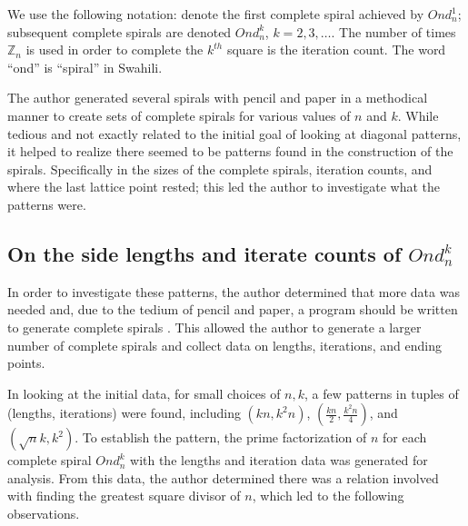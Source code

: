 \documentclass[11pt,reqno]{amsart}
\theoremstyle{mydef}
\def\ZZ{\mathbb{Z}}
\begin{document}
We use the following notation: denote the first complete spiral
achieved by $Ond^1_n$; subsequent complete spirals are denoted
$Ond^k_n$, $k = 2,3,\dots$.  The number of times $\ZZ_n$ is used in
order to complete the $k^{th}$ square is the iteration count.  The
word ``ond'' is ``spiral'' in Swahili.


The author generated several spirals with pencil and paper in a
methodical manner to create sets of complete spirals for various
values of $n$ and $k$.  While tedious and not exactly related to the
initial goal of looking at diagonal patterns, it helped to realize
there seemed to be patterns found in the construction of the spirals.
Specifically in the sizes of the complete spirals, iteration counts,
and where the last lattice point rested; this led the author to
investigate what the patterns were.

\subsection{On the side lengths and iterate counts of $Ond^k_n$}

In order to investigate these patterns, the author determined that
more data was needed and, due to the tedium of pencil and paper, a
program should be written to generate complete spirals
\cite{PySquare}.  This allowed the author to generate a larger number
of complete spirals and collect data on lengths, iterations, and
ending points.

In looking at the initial data, for small choices of $n, k$, a few
patterns in tuples of (lengths, iterations) were found, including
$(kn, k^2 n)$, $(\frac{kn}{2}, \frac{k^2 n}{4})$, and $(\sqrt{n}k,
k^2)$.  To establish the pattern, the prime factorization of $n$ for
each complete spiral $Ond^k_n$ with the lengths and iteration data was
generated for analysis.  From this data, the author determined there
was a relation involved with finding the greatest square divisor of
$n$, which led to the following observations.
\end{document}
